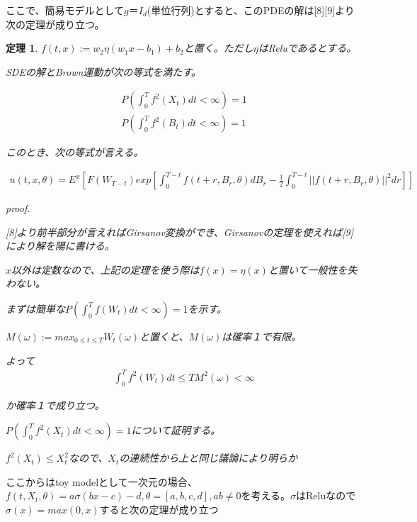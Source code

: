 \documentclass{jsarticle}
\newtheorem{theo}{定理}[section]
\begin{document}
ここで、簡易モデルとして$g＝I_d$(単位行列)とすると、このPDEの解は[8][9]より次の定理が成り立つ。

\begin{theo}

$f(t,x):=w_2\eta(w_1 x-b_1)+b_2$と置く。ただし$\eta$はReluであるとする。

SDEの解とBrown運動が次の等式を満たす。

\begin{align}
P(\int^T_0f^2(X_t)dt<\infty)=1 \\
P(\int^T_0f^2(B_t)dt<\infty)=1 
\end{align}

このとき、次の等式が言える。

\begin{align}
u(t,x,\theta)=E^x[F(W_{T-t})exp[\int_0^{T-t} f(t+r,B_r,\theta)dB_r-\frac{1}{2} \int^{T-t}_0||f(t+r,B_r,\theta)||^2dr]]
\end{align}


proof.

[8]より前半部分が言えればGirsanov変換ができ、Girsanovの定理を使えれば[9]により解を陽に書ける。



$x$以外は定数なので、上記の定理を使う際は$f(x)=\eta(x)$と置いて一般性を失わない。

まずは簡単な$P(\int^T_0f(W_t)dt<\infty)=1 $を示す。

$M(\omega):=max_{0\leq t \leq T}W_t(\omega)$と置くと、$M(\omega)$は確率１で有限。

よって
\begin{align}
\int^T_0f^2(W_t)dt\leq T M^2(\omega)<\infty
\end{align}

か確率１で成り立つ。

$P(\int^T_0f^2(X_t)dt<\infty)=1$について証明する。

$f^2(X_t)\leq X^2_t$なので、$X_t$の連続性から上と同じ議論により明らか


\end{theo}


ここからはtoy modelとして一次元の場合、$f(t,X_t,\theta)=a\sigma(bx-c)-d,\theta=[a,b,c,d],ab\neq0$を考える。$\sigma$はReluなので$\sigma(x)=max(0,x)$すると次の定理が成り立つ
\end{document}
